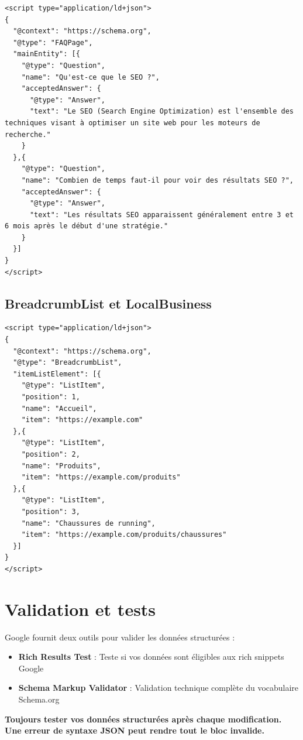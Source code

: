 \documentclass[12pt,a4paper,twoside]{report}
\newcommand{\important}[1]{\textbf{\textcolor{googlered}{#1}}}
\begin{document}
\begin{lstlisting}[style=htmlcode,caption={Schema FAQPage}]
<script type="application/ld+json">
{
  "@context": "https://schema.org",
  "@type": "FAQPage",
  "mainEntity": [{
    "@type": "Question",
    "name": "Qu'est-ce que le SEO ?",
    "acceptedAnswer": {
      "@type": "Answer",
      "text": "Le SEO (Search Engine Optimization) est l'ensemble des techniques visant à optimiser un site web pour les moteurs de recherche."
    }
  },{
    "@type": "Question",
    "name": "Combien de temps faut-il pour voir des résultats SEO ?",
    "acceptedAnswer": {
      "@type": "Answer",
      "text": "Les résultats SEO apparaissent généralement entre 3 et 6 mois après le début d'une stratégie."
    }
  }]
}
</script>
\end{lstlisting}

\subsection{BreadcrumbList et LocalBusiness}

\begin{lstlisting}[style=htmlcode,caption={Schema BreadcrumbList}]
<script type="application/ld+json">
{
  "@context": "https://schema.org",
  "@type": "BreadcrumbList",
  "itemListElement": [{
    "@type": "ListItem",
    "position": 1,
    "name": "Accueil",
    "item": "https://example.com"
  },{
    "@type": "ListItem",
    "position": 2,
    "name": "Produits",
    "item": "https://example.com/produits"
  },{
    "@type": "ListItem",
    "position": 3,
    "name": "Chaussures de running",
    "item": "https://example.com/produits/chaussures"
  }]
}
</script>
\end{lstlisting}

\section{Validation et tests}

Google fournit deux outils pour valider les données structurées :

\begin{itemize}
    \item \textbf{Rich Results Test} : Teste si vos données sont éligibles aux rich snippets Google
    \item \textbf{Schema Markup Validator} : Validation technique complète du vocabulaire Schema.org
\end{itemize}

\important{Toujours tester vos données structurées après chaque modification. Une erreur de syntaxe JSON peut rendre tout le bloc invalide.}
\end{document}
